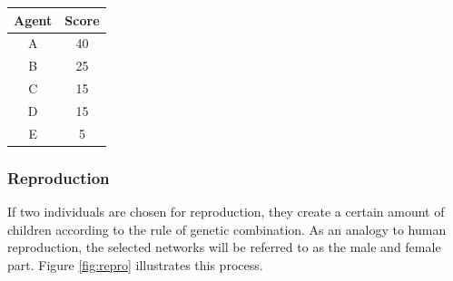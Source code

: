 \documentclass[10pt,a4paper,DIV=11]{scrreprt}
\begin{document}
\begin{minipage}{\textwidth}
  \begin{minipage}[b]{0.49\textwidth}
    \centering
        \label{fig:roul}
  \end{minipage}
  \hfill
  \begin{minipage}[b]{0.49\textwidth}
    \centering
      \begin{tabular}{|c|c|} \hline
         Agent & Score \\ \hline
         A & 40 \\ \hline
         B & 25 \\ \hline
         C & 15 \\ \hline
         D & 15 \\ \hline
         E & 5  \\ \hline
      \end{tabular}
          \label{tab:rank}
    \end{minipage}
  \end{minipage}

\subsubsection{Reproduction}
If two individuals are chosen for reproduction, they create a certain amount of children according to the rule of genetic combination. 
As an analogy to human reproduction, the selected networks will be referred to as the male and female part. Figure \ref{fig:repro} illustrates 
this process. 
\end{document}
